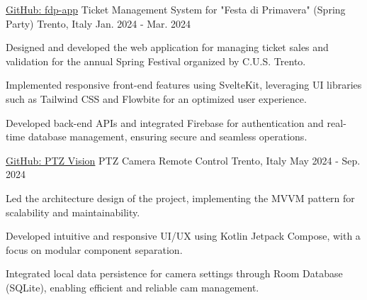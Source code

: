 

\begin{cventries}

  \cventry
    {\href{https://github.com/Festa-di-Primavera/fdp-app}{GitHub: fdp-app}} %
    {Ticket Management System for "Festa di Primavera" (Spring Party)} %
    {Trento, Italy} %
    {Jan. 2024 - Mar. 2024} %
    {
      \begin{cvitems} %
        \item {Designed and developed the web application for managing ticket sales and validation for the annual Spring Festival organized by C.U.S. Trento.}
        \item {Implemented responsive front-end features using SvelteKit, leveraging UI libraries such as Tailwind CSS and Flowbite for an optimized user experience.}
        \item {Developed back-end APIs and integrated Firebase for authentication and real-time database management, ensuring secure and seamless operations.}
      \end{cvitems}
    }

\cventry
{
  \href{https://github.com/PTZ-Vision/PTZ-Vision-Android}{GitHub: PTZ Vision}} %
  {PTZ Camera Remote Control} %
  {Trento, Italy} %
  {May 2024 - Sep. 2024} %
    {
    \begin{cvitems} 
        \item {Led the architecture design of the project, implementing the MVVM pattern for scalability and maintainability.}
        \item {Developed intuitive and responsive UI/UX using Kotlin Jetpack Compose, with a focus on modular component separation.}
        \item {Integrated local data persistence for camera settings through Room Database (SQLite), enabling efficient and reliable cam management.}
    \end{cvitems} 
    }

\end{cventries}